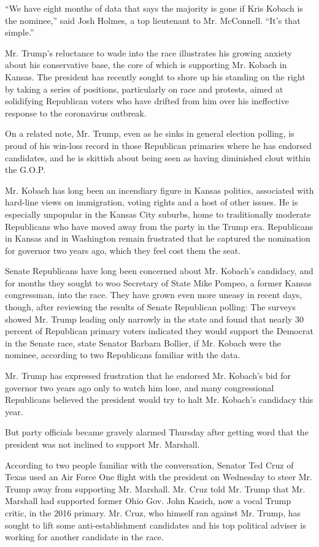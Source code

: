 ``We have eight months of data that says the majority is gone if Kris
Kobach is the nominee,'' said Josh Holmes, a top lieutenant to Mr.
McConnell. ``It's that simple.''

Mr. Trump's reluctance to wade into the race illustrates his growing
anxiety about his conservative base, the core of which is supporting Mr.
Kobach in Kansas. The president has recently sought to shore up his
standing on the right by taking a series of positions, particularly on
race and protests, aimed at solidifying Republican voters who have
drifted from him over his ineffective response to the coronavirus
outbreak.

On a related note, Mr. Trump, even as he sinks in general election
polling, is proud of his win-loss record in those Republican primaries
where he has endorsed candidates, and he is skittish about being seen as
having diminished clout within the G.O.P.

Mr. Kobach has long been an incendiary figure in Kansas politics,
associated with hard-line views on immigration, voting rights and a host
of other issues. He is especially unpopular in the Kansas City suburbs,
home to traditionally moderate Republicans who have moved away from the
party in the Trump era. Republicans in Kansas and in Washington remain
frustrated that he captured the nomination for governor two years ago,
which they feel cost them the seat.

Senate Republicans have long been concerned about Mr. Kobach's
candidacy, and for months they sought to woo Secretary of State Mike
Pompeo, a former Kansas congressman, into the race. They have grown even
more uneasy in recent days, though, after reviewing the results of
Senate Republican polling: The surveys showed Mr. Trump leading only
narrowly in the state and found that nearly 30 percent of Republican
primary voters indicated they would support the Democrat in the Senate
race, state Senator Barbara Bollier, if Mr. Kobach were the nominee,
according to two Republicans familiar with the data.

Mr. Trump has expressed frustration that he endorsed Mr. Kobach's bid
for governor two years ago only to watch him lose, and many
congressional Republicans believed the president would try to halt Mr.
Kobach's candidacy this year.

But party officials became gravely alarmed Thursday after getting word
that the president was not inclined to support Mr. Marshall.

According to two people familiar with the conversation, Senator Ted Cruz
of Texas used an Air Force One flight with the president on Wednesday to
steer Mr. Trump away from supporting Mr. Marshall. Mr. Cruz told Mr.
Trump that Mr. Marshall had supported former Ohio Gov. John Kasich, now
a vocal Trump critic, in the 2016 primary. Mr. Cruz, who himself ran
against Mr. Trump, has sought to lift some anti-establishment candidates
and his top political adviser is working for another candidate in the
race.

